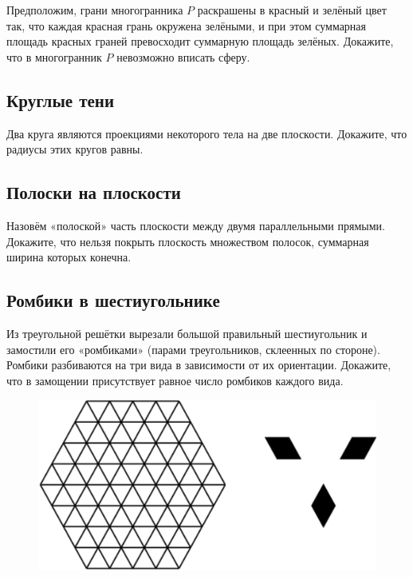 Предположим, грани многогранника $P$ раскрашены в красный и зелёный цвет так, что каждая красная грань окружена зелёными, и при этом суммарная площадь красных граней превосходит суммарную площадь зелёных.
Докажите, что в многогранник $P$ невозможно вписать сферу.

\subsection*{Круглые тени}%

Два круга являются проекциями некоторого тела на две плоскости.
Докажите, что радиусы этих кругов равны.

\subsection*{Полоски на плоскости}%

Назовём «полоской» часть плоскости между двумя параллельными прямыми.
Докажите, что нельзя покрыть плоскость множеством полосок, суммарная ширина которых конечна.

\subsection*{Ромбики в шестиугольнике}%

Из треугольной решётки вырезали большой правильный шестиугольник и замостили его «ромбиками» (парами  треугольников, склеенных по стороне).
Ромбики разбиваются на три вида в зависимости от их ориентации.
Докажите, что в замощении присутствует равное число ромбиков каждого вида.

\begin{figure}[h!]
\centering
\includegraphics[scale=0.55]{Figs/Geometry/hex}
\end{figure}

